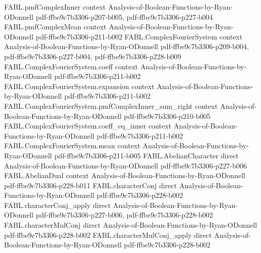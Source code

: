 \begin{theorem}
\label{FABL.ComplexFourierSystem.mean_eq_coeff_zero}
\leanok
{}
\proofstep
  {FABL.pmfComplexInner}
  {context}
  {Analysis-of-Boolean-Functions-by-Ryan-ODonnell}
  {pdf-ffbe9c7b3306-p207-b005,
    pdf-ffbe9c7b3306-p227-b004}
\proofstep
  {FABL.pmfComplexMean}
  {context}
  {Analysis-of-Boolean-Functions-by-Ryan-ODonnell}
  {pdf-ffbe9c7b3306-p211-b002}
\proofstep
  {FABL.ComplexFourierSystem}
  {context}
  {Analysis-of-Boolean-Functions-by-Ryan-ODonnell}
  {pdf-ffbe9c7b3306-p209-b004,
    pdf-ffbe9c7b3306-p227-b004,
    pdf-ffbe9c7b3306-p228-b009}
\proofstep
  {FABL.ComplexFourierSystem.coeff}
  {context}
  {Analysis-of-Boolean-Functions-by-Ryan-ODonnell}
  {pdf-ffbe9c7b3306-p211-b002}
\proofstep
  {FABL.ComplexFourierSystem.expansion}
  {context}
  {Analysis-of-Boolean-Functions-by-Ryan-ODonnell}
  {pdf-ffbe9c7b3306-p211-b002}
\proofstep
  {FABL.ComplexFourierSystem.pmfComplexInner_sum_right}
  {context}
  {Analysis-of-Boolean-Functions-by-Ryan-ODonnell}
  {pdf-ffbe9c7b3306-p210-b005}
\proofstep
  {FABL.ComplexFourierSystem.coeff_eq_inner}
  {context}
  {Analysis-of-Boolean-Functions-by-Ryan-ODonnell}
  {pdf-ffbe9c7b3306-p211-b002}
\proofstep
  {FABL.ComplexFourierSystem.mean}
  {context}
  {Analysis-of-Boolean-Functions-by-Ryan-ODonnell}
  {pdf-ffbe9c7b3306-p211-b005}
\proofstep
  {FABL.AbelianCharacter}
  {direct}
  {Analysis-of-Boolean-Functions-by-Ryan-ODonnell}
  {pdf-ffbe9c7b3306-p227-b006}
\proofstep
  {FABL.AbelianDual}
  {context}
  {Analysis-of-Boolean-Functions-by-Ryan-ODonnell}
  {pdf-ffbe9c7b3306-p228-b011}
\proofstep
  {FABL.characterConj}
  {direct}
  {Analysis-of-Boolean-Functions-by-Ryan-ODonnell}
  {pdf-ffbe9c7b3306-p228-b002}
\proofstep
  {FABL.characterConj_apply}
  {direct}
  {Analysis-of-Boolean-Functions-by-Ryan-ODonnell}
  {pdf-ffbe9c7b3306-p227-b006,
    pdf-ffbe9c7b3306-p228-b002}
\proofstep
  {FABL.characterMulConj}
  {direct}
  {Analysis-of-Boolean-Functions-by-Ryan-ODonnell}
  {pdf-ffbe9c7b3306-p228-b002}
\proofstep
  {FABL.characterMulConj_apply}
  {direct}
  {Analysis-of-Boolean-Functions-by-Ryan-ODonnell}
  {pdf-ffbe9c7b3306-p228-b002}

\end{theorem}
